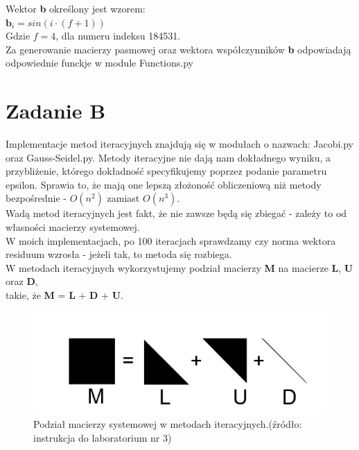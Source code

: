 \documentclass[fleqn]{article}
\begin{document}
    \noindent Wektor \textbf{b} określony jest wzorem:\\

    $\bm{b}_i = sin(i \cdot (f + 1))$ \\  

    \noindent Gdzie $f = 4$, dla numeru indeksu 184531.\\

    \noindent Za generowanie macierzy pasmowej oraz wektora współczynników \textbf{b} odpowiadają
    odpowiednie funckje w module Functions.py
    \newpage


    \section{Zadanie B}
    Implementacje metod iteracyjnych znajdują się w modułach o nazwach: Jacobi.py oraz Gauss-Seidel.py.
    Metody iteracyjne nie dają nam dokładnego wyniku, a przybliżenie, którego dokładność
    specyfikujemy poprzez podanie parametru epsilon. Sprawia to, że mają one lepszą złożoność obliczeniową
    niż metody bezpośrednie - $O(n^2)$ zamiast $O(n^3)$.\\
     Wadą metod iteracyjnych jest fakt, że nie zawsze będą się zbiegać - zależy to 
    od własności macierzy systemowej.\\
    W moich implementacjach, po 100 iteracjach sprawdzamy czy norma wektora residuum wzrosła - jeżeli tak, to metoda się rozbiega. \\ 
    \noindent W metodach iteracyjnych wykorzystujemy podział macierzy \textbf{M} na macierze \textbf{L}, \textbf{U} oraz \textbf{D}, \\ 
    takie, że \textbf{M} = \textbf{L} + \textbf{D} + \textbf{U}.
    
    \begin{figure}[h]

        \centering
        \includegraphics[]{LUD}
        \centering
        \caption{Podział macierzy systemowej w metodach iteracyjnych.(źródło: instrukcja do laboratorium nr 3)}

    \end{figure}
\end{document}
